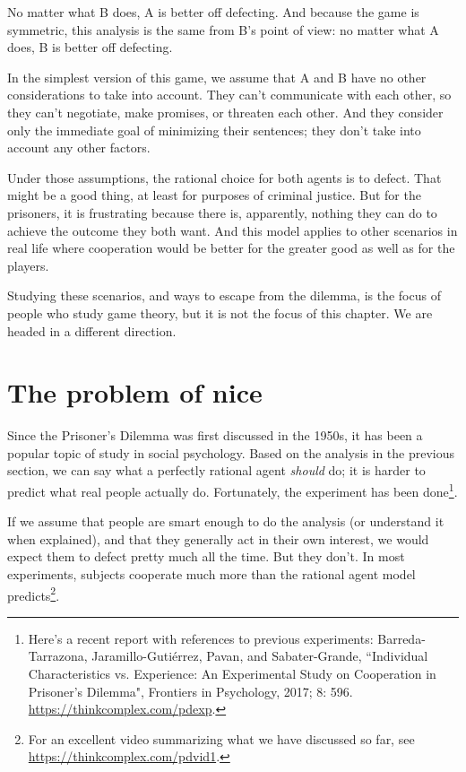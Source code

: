 \documentclass[12pt]{book}
\theoremstyle{exercise}
\begin{document}
No matter what B does, A is better off defecting.
And because the game is symmetric, this analysis is the same from B's point of view: no matter what A does, B is better off defecting.

In the simplest version of this game, we assume that A and B have no other considerations to take into account.  They can't communicate with each other, so they can't negotiate, make promises, or threaten each other.  And they consider only the immediate goal of minimizing their sentences; they don't take into account any other factors.


Under those assumptions, the rational choice for both agents is to defect.  That might be a good thing, at least for purposes of criminal justice.  But for the prisoners, it is frustrating because there is, apparently, nothing they can do to achieve the outcome they both want.  And this model applies to other scenarios in real life where cooperation would be better for the greater good as well as for the players.

Studying these scenarios, and ways to escape from the dilemma, is the focus of people who study game theory, but it is not the focus of this chapter.  We are headed in a different direction.


\section{The problem of nice}

Since the Prisoner's Dilemma was first discussed in the 1950s, it has been a popular topic of study in social psychology.  Based on the analysis in the previous section, we can say what a perfectly rational agent {\em should} do; it is harder to predict what real people actually do.  Fortunately, the experiment has been done\footnote{Here's a recent report with references to previous experiments:
Barreda-Tarrazona, Jaramillo-Guti\'{e}rrez, Pavan, and Sabater-Grande,
``Individual Characteristics vs. Experience: An Experimental Study on Cooperation in Prisoner's Dilemma", Frontiers in Psychology, 2017; 8: 596.
\url{https://thinkcomplex.com/pdexp}.}.


If we assume that people are smart enough to do the analysis (or understand it when explained), and that they generally act in their own interest, we would expect them to defect pretty much all the time.  But they don't.  In most experiments, subjects cooperate much more than the rational agent model predicts\footnote{For an excellent video summarizing what we have discussed so far, see \url{https://thinkcomplex.com/pdvid1}.}.
\end{document}
